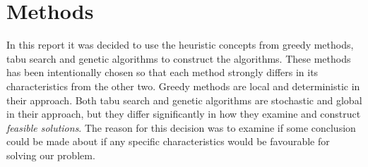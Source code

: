 \chapter{Methods}
In this report it was decided to use the heuristic concepts from greedy methods, tabu search and genetic algorithms to construct the algorithms. These methods has been intentionally chosen so that each method strongly differs in its characteristics from the other two. Greedy methods are local and deterministic in their approach. Both tabu search and genetic algorithms are stochastic and global in their approach, but they differ significantly in how they examine and construct \emph{feasible solutions}. The reason for this decision was to examine if some conclusion could be made about if any specific characteristics would be favourable for solving our problem. 







